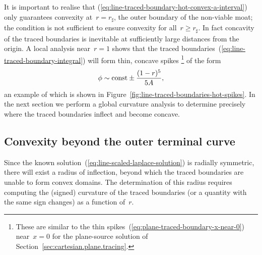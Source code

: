 \begin{figure}
\end{figure}

It is important to realise that
(\ref{eq:line-traced-boundary-hot-convex-a-interval})~%
only guarantees convexity at~$r = r_\sharp$,
the outer boundary of the non-viable moat;
the condition is not sufficient to ensure convexity for all~$r \ge r_\sharp$.
In fact concavity of the traced boundaries is inevitable
at sufficiently large distances from the origin.
A local analysis near~$r = 1$ shows that
the traced boundaries~(\ref{eq:line-traced-boundary-integral})
will form thin, concave spikes%
\footnote{
  These are similar
  to the thin spikes~(\ref{eq:plane-traced-boundary-x-near-0})
  near~$x = 0$ for the plane-source solution
  of Section~\ref{sec:cartesian.plane.tracing}.
}
of the form
\begin{equation}
  \phi \sim \mathrm{const} \pm \frac{(1 - r)^5}{5 A},
  \label{eq:line-traced-boundary-r-near-1}
\end{equation}
an example of which is shown in
Figure~\ref{fig:line-traced-boundaries-hot-spikes}.
In the next section we perform a global curvature analysis
to determine precisely where the traced boundaries inflect
and become concave.

\subsection{Convexity beyond the outer terminal curve}
\label{sec:polar.convex.beyond}

Since the known solution~(\ref{eq:line-scaled-laplace-solution})
is radially symmetric,
there will exist a radius of inflection,
beyond which the traced boundaries are unable to form convex domains.
The determination of this radius requires
computing the (signed) curvature of the traced boundaries
(or a quantity with the same sign changes)
as a function of~$r$.

